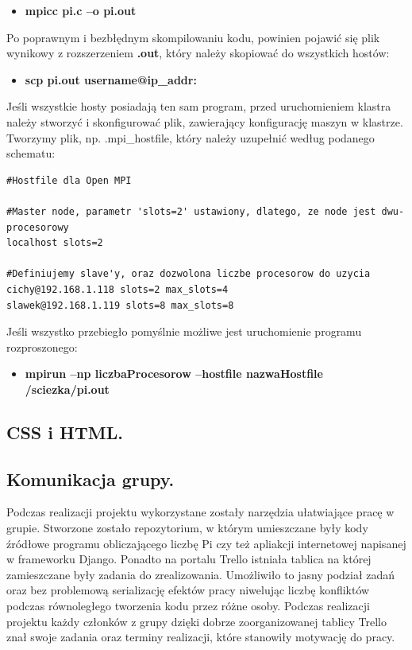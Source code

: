 \documentclass[a4paper,12pt]{article}		%
\begin{document}
\begin{itemize}
\item \textbf{mpicc pi.c –o pi.out}
\end{itemize}

Po poprawnym i bezbłędnym skompilowaniu kodu, powinien pojawić się plik wynikowy z rozszerzeniem \textbf{.out}, który należy skopiować do wszystkich hostów:

\begin{itemize}
\item \textbf{scp pi.out username@ip\_addr:~}
\end{itemize}

Jeśli wszystkie hosty posiadają ten sam program, przed uruchomieniem klastra należy stworzyć i skonfigurować plik, zawierający konfigurację maszyn w klastrze. Tworzymy plik, np. .mpi\_hostfile, który należy uzupełnić według podanego schematu:

\begin{lstlisting}
#Hostfile dla Open MPI

#Master node, parametr 'slots=2' ustawiony, dlatego, ze node jest dwu-procesorowy
localhost slots=2

#Definiujemy slave'y, oraz dozwolona liczbe procesorow do uzycia
cichy@192.168.1.118 slots=2 max_slots=4
slawek@192.168.1.119 slots=8 max_slots=8
\end{lstlisting}

Jeśli wszystko przebiegło pomyślnie możliwe jest uruchomienie programu rozproszonego:
\begin{itemize}
\item \textbf{mpirun –np liczbaProcesorow –hostfile nazwaHostfile /sciezka/pi.out}
\end{itemize}

\subsection{CSS i HTML.}

\subsection{Komunikacja grupy.}
Podczas realizacji projektu wykorzystane zostały narzędzia ułatwiające pracę w grupie. Stworzone zostało repozytorium, w którym umieszczane były kody źródłowe programu obliczającego liczbę Pi czy też apliakcji internetowej napisanej w frameworku Django. Ponadto na portalu Trello istniała tablica na której zamieszczane były zadania do zrealizowania. Umożliwiło to jasny podział zadań oraz bez problemową serializację efektów pracy niwelując liczbę konfliktów podczas równoległego tworzenia kodu przez różne osoby. Podczas realizacji projektu każdy członków z grupy dzięki dobrze zoorganizowanej tablicy Trello znał swoje zadania oraz terminy realizacji, które stanowiły motywację do pracy.
\end{document}
